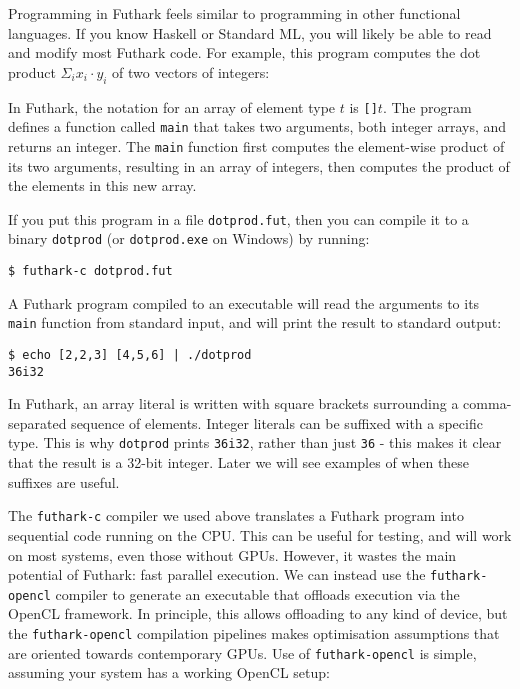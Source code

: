 \documentclass[oneside,11pt]{book}
\begin{document}
Programming in Futhark feels similar to programming in other
functional languages.  If you know Haskell or Standard ML, you will
likely be able to read and modify most Futhark code.  For example,
this program computes the dot product $\Sigma_{i} x_{i}\cdot{}y_{i}$
of two vectors of integers:



In Futhark, the notation for an array of element type $t$ is
\texttt{[]$t$}.  The program defines a function called \texttt{main}
that takes two arguments, both integer arrays, and returns an integer.
The \texttt{main} function first computes the element-wise product of
its two arguments, resulting in an array of integers, then computes
the product of the elements in this new array.

If you put this program in a file \texttt{dotprod.fut}, then you can
compile it to a binary \texttt{dotprod} (or \texttt{dotprod.exe} on
Windows) by running:

\begin{verbatim}
$ futhark-c dotprod.fut
\end{verbatim}

A Futhark program compiled to an executable will read the arguments to
its \texttt{main} function from standard input, and will print the
result to standard output:

\begin{verbatim}
$ echo [2,2,3] [4,5,6] | ./dotprod
36i32
\end{verbatim}

In Futhark, an array literal is written with square brackets
surrounding a comma-separated sequence of elements.  Integer literals
can be suffixed with a specific type.  This is why \texttt{dotprod}
prints \texttt{36i32}, rather than just \texttt{36} - this makes it
clear that the result is a 32-bit integer.  Later we will see examples
of when these suffixes are useful.

The \texttt{futhark-c} compiler we used above translates a Futhark
program into sequential code running on the CPU.  This can be useful
for testing, and will work on most systems, even those without GPUs.
However, it wastes the main potential of Futhark: fast parallel
execution.  We can instead use the \texttt{futhark-opencl} compiler to
generate an executable that offloads execution via the OpenCL
framework.  In principle, this allows offloading to any kind of
device, but the \texttt{futhark-opencl} compilation pipelines makes
optimisation assumptions that are oriented towards contemporary GPUs.
Use of \texttt{futhark-opencl} is simple, assuming your system has a
working OpenCL setup:
\end{document}
